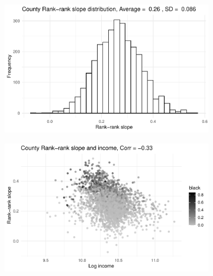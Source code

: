 \begin{figure}[htp]
    \caption{\cite{chetty2014}'s rank-rank slope descriptives \newline CZ = Commuting zones}\vspace{5mm}
    \label{ch04:rank_slope_distribution}
     \centering
     \begin{subfigure}[b]{0.4\textwidth}
         \centering
         \includegraphics[width=\textwidth]{plots/rank-rank/cty_rrs_hist.pdf}
     \end{subfigure}
     \begin{subfigure}[b]{0.4\textwidth}
         \centering
         \includegraphics[width=\textwidth]{plots/rank-rank/cty_rrs_income.pdf}
     \end{subfigure}\vspace{5mm}


\end{figure}
